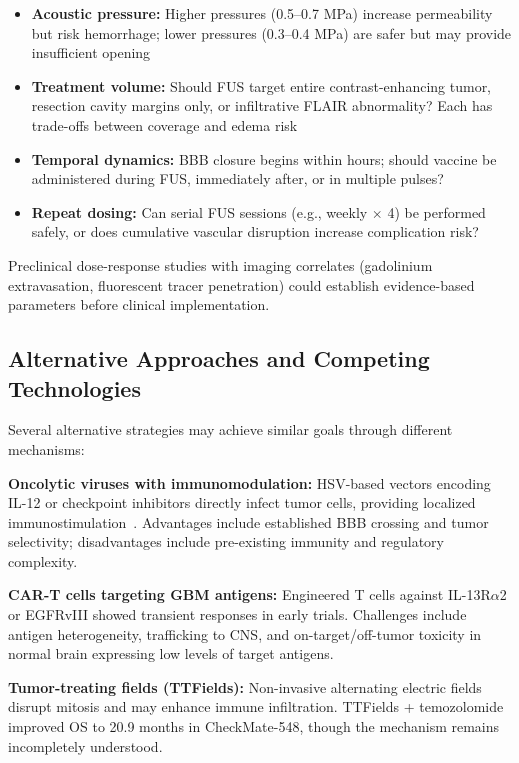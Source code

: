 \documentclass[12pt]{article}
\begin{document}
\begin{itemize}[leftmargin=*,noitemsep]
\item \textbf{Acoustic pressure:} Higher pressures (0.5--0.7 MPa) increase permeability but risk hemorrhage; lower pressures (0.3--0.4 MPa) are safer but may provide insufficient opening
\item \textbf{Treatment volume:} Should FUS target entire contrast-enhancing tumor, resection cavity margins only, or infiltrative FLAIR abnormality? Each has trade-offs between coverage and edema risk
\item \textbf{Temporal dynamics:} BBB closure begins within hours; should vaccine be administered during FUS, immediately after, or in multiple pulses?
\item \textbf{Repeat dosing:} Can serial FUS sessions (e.g., weekly $\times$ 4) be performed safely, or does cumulative vascular disruption increase complication risk?
\end{itemize}

Preclinical dose-response studies with imaging correlates (gadolinium extravasation, fluorescent tracer penetration) could establish evidence-based parameters before clinical implementation.

\subsection{Alternative Approaches and Competing Technologies}
Several alternative strategies may achieve similar goals through different mechanisms:

\textbf{Oncolytic viruses with immunomodulation:} HSV-based vectors encoding IL-12 or checkpoint inhibitors directly infect tumor cells, providing localized immunostimulation~\citep{lim2024}. Advantages include established BBB crossing and tumor selectivity; disadvantages include pre-existing immunity and regulatory complexity.

\textbf{CAR-T cells targeting GBM antigens:} Engineered T cells against IL-13R$\alpha$2 or EGFRvIII showed transient responses in early trials. Challenges include antigen heterogeneity, trafficking to CNS, and on-target/off-tumor toxicity in normal brain expressing low levels of target antigens.

\textbf{Tumor-treating fields (TTFields):} Non-invasive alternating electric fields disrupt mitosis and may enhance immune infiltration. TTFields + temozolomide improved OS to 20.9 months in CheckMate-548, though the mechanism remains incompletely understood.
\end{document}
